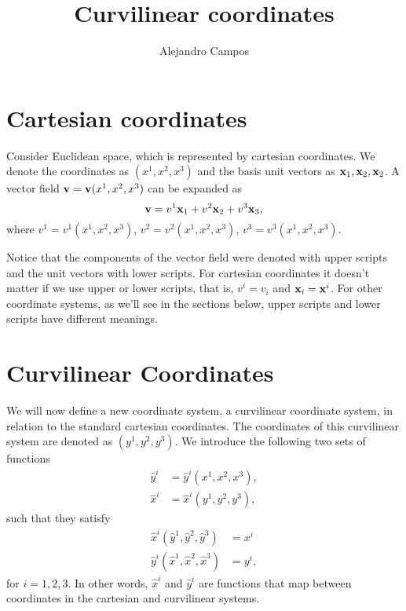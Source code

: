 \documentclass[11pt]{article}
\title{Curvilinear coordinates}
\author{Alejandro Campos}
\newcommand{\yhat}{\hat{y}}
\newcommand{\xhat}{\hat{x}}
\begin{document}
\maketitle
\tableofcontents

\section{Cartesian coordinates}
Consider Euclidean space, which is represented by cartesian coordinates. We denote the coordinates as $(x^1,x^2,x^3)$ and the basis unit vectors as $\mathbf{x}_1, \mathbf{x}_2, \mathbf{x}_2$. A vector field $\mathbf{v} = \mathbf{v}(x^1, x^2, x^3)$ can be expanded as 
\begin{equation}
    \label{eq:vector_cartesian}
    \mathbf{v} = v^1 \mathbf{x}_1 + v^2 \mathbf{x}_2 + v^3 \mathbf{x}_3,
\end{equation}
where $v^1 = v^1(x^1, x^2, x^3)$, $v^2 = v^2(x^1, x^2, x^3)$, $v^3 = v^3(x^1, x^2, x^3)$. 

Notice that the components of the vector field were denoted with upper scripts and the unit vectors with lower scripts. For cartesian coordinates it doesn't matter if we use upper or lower scripts, that is, $v^i = v_i$ and $\mathbf{x}_i=\mathbf{x}^i$. For other coordinate systems, as we'll see in the sections below, upper scripts and lower scripts have different meanings.

\section{Curvilinear Coordinates}
We will now define a new coordinate system, a curvilinear coordinate system, in relation to the standard cartesian coordinates. The coordinates of this curvilinear system are denoted as $(y^1, y^2, y^3)$. We introduce the following two sets of functions
\begin{align}
\yhat^i &= \yhat^i(x^1, x^2, x^3), \\
\xhat^i &= \xhat^i(y^1,y^2,y^3),
\end{align}
such that they satisfy
\begin{align}
    \xhat^i(\yhat^1, \yhat^2, \yhat^3) &= x^i \label{eq:trans1}\\
    \yhat^i(\xhat^1, \xhat^2, \xhat^3) &= y^i \label{eq:trans2},
\end{align}
for $i=1,2,3$. In other words, $\xhat^i$ and $\yhat^i$ are functions that map between coordinates in the cartesian and curvilinear systems. 
\end{document}
